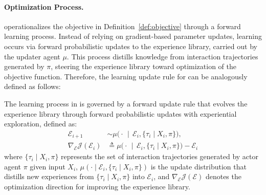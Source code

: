 \paragraph{Optimization Process.}
\method{} operationalizes the objective in Definition~\ref{def:objective} through a forward learning process. 
Instead of relying on gradient-based parameter updates, learning occurs via forward probabilistic updates to the experience library, carried out by the updater agent $\mu$.
This process distills knowledge from interaction trajectories generated by $\pi$, steering the experience library toward optimization of the objective function. 
Therefore, the learning update rule for \method{} can be analogously defined as follows:

\begin{definition}
\label{def:forward_update}
The learning process in \method{} is governed by a forward update rule that evolves the experience library through forward probabilistic updates with experiential exploration, defined as:
\begin{equation}
\begin{aligned}
\mathcal{E}_{i+1} 
&\sim \mu\big(\cdot \,\mid\, \mathcal{E}_i, \{\tau_i \mid X_i, \pi\}\big), \\
\nabla_{\mathcal{E}}\mathcal{J}(\mathcal{E}_i) 
&\triangleq \mu\big(\cdot \,\mid\, \mathcal{E}_i, \{\tau_i \mid X_i, \pi\}\big) - \mathcal{E}_i
\end{aligned}
\label{eq:meta_update}
\end{equation}
where $\{\tau_i\mid X_i,\pi\}$ represents the set of interaction trajectories generated by actor agent $\pi$ given input $X_i$, $\mu(\cdot\mid\mathcal{E}_{i},\{\tau_i\mid X_i,\pi\})$ is the update distribution that distills new experiences from $\{\tau_i\mid X_i,\pi\}$ into $\mathcal{E}_i$, and $\nabla_{\mathcal{E}}\mathcal{J}(\mathcal{E})$ denotes the optimization direction for improving the experience library.
\end{definition}

